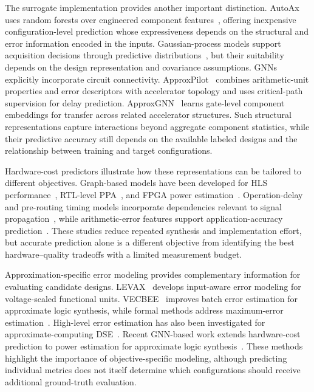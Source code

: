 The surrogate implementation provides another important distinction.
AutoAx uses random forests over engineered component features~\cite{mrazek2019autoax}, offering inexpensive configuration-level prediction whose expressiveness depends on the structural and error information encoded in the inputs.
Gaussian-process models support acquisition decisions through predictive distributions~\cite{knowles2006parego,eriksson2019turbo,bai2021boomexplorer}, but their suitability depends on the design representation and covariance assumptions.
GNNs explicitly incorporate circuit connectivity.
ApproxPilot~\cite{zhang2025approxpilot} combines arithmetic-unit properties and error descriptors with accelerator topology and uses critical-path supervision for delay prediction.
ApproxGNN~\cite{vlcek2025approxgnn} learns gate-level component embeddings for transfer across related accelerator structures.
Such structural representations capture interactions beyond aggregate component statistics, while their predictive accuracy still depends on the available labeled designs and the relationship between training and target configurations.

Hardware-cost predictors illustrate how these representations can be tailored to different objectives.
Graph-based models have been developed for HLS performance~\cite{wu2022hls_gnn}, RTL-level PPA~\cite{xu2022sns}, and FPGA power estimation~\cite{lin2022powergear}.
Operation-delay and pre-routing timing models incorporate dependencies relevant to signal propagation~\cite{ustun2020delay,guo2022timingpredict}, while arithmetic-error features support application-accuracy prediction~\cite{mo2024errorfeatures}.
These studies reduce repeated synthesis and implementation effort, but accurate prediction alone is a different objective from identifying the best hardware--quality tradeoffs with a limited measurement budget.

Approximation-specific error modeling provides complementary information for evaluating candidate designs.
LEVAX~\cite{jiao2020levax} develops input-aware error modeling for voltage-scaled functional units.
VECBEE~\cite{su2022vecbee} improves batch error estimation for approximate logic synthesis, while formal methods address maximum-error estimation~\cite{scarabottolo2022formal}.
High-level error estimation has also been investigated for approximate-computing DSE~\cite{vaeztourshizi2023error}.
Recent GNN-based work extends hardware-cost prediction to power estimation for approximate logic synthesis~\cite{li2026powergap}.
These methods highlight the importance of objective-specific modeling, although predicting individual metrics does not itself determine which configurations should receive additional ground-truth evaluation.

